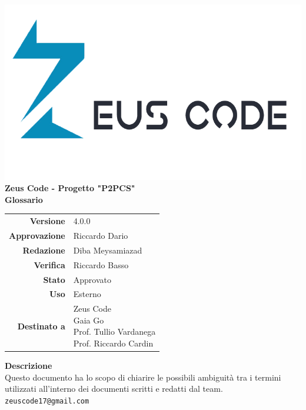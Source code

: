 \thispagestyle{empty}
\begin{titlepage}
	\begin{center}
		\includegraphics[scale = 0.3]{res/images/zeus_code_logo.png}\\
		\large \textbf{Zeus Code - Progetto "P2PCS"} \\
		\vfill
		\Huge \textbf{Glossario}
		\vspace*{\fill} 
        \vfill
        \large
        \begin{tabular}{r|l}
                        \textbf{Versione} & 4.0.0\\
                        \textbf{Approvazione} & Riccardo Dario\\
                        \textbf{Redazione} & Diba Meysamiazad\\
                        
                        \textbf{Verifica} & Riccardo Basso\\
                        \textbf{Stato} & Approvato\\
                        \textbf{Uso} & Esterno\\
                        \textbf{Destinato a} & \parbox[t]{5cm}{Zeus Code\\ Gaia Go\\Prof. Tullio Vardanega\\Prof. Riccardo Cardin}
                \end{tabular}
                \vfill
                \normalsize
                \textbf{Descrizione}\\
                Questo documento ha lo scopo di chiarire le possibili ambiguità tra i termini utilizzati all'interno dei documenti scritti e redatti dal team.\\
                \vfill
                \small
                \texttt{zeuscode17@gmail.com}
	\end{center}
\end{titlepage}